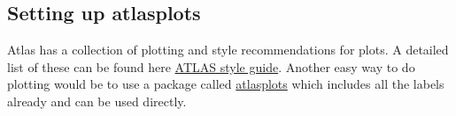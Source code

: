 \documentclass[letterpaper,12pt]{article}
\begin{document}
\subsection{Setting up atlasplots}
Atlas has a collection of plotting and style recommendations for plots. A detailed list of these can be found here \href{https://cds.cern.ch/record/1110290/files/gen-pub-2008-001.pdf}{ATLAS style guide}. Another easy way to do plotting would be to use a package called \href{https://atlas-plots.readthedocs.io/en/latest/index.html}{atlasplots} which includes all the labels already and can be used directly.



% 
% 








\end{document}
